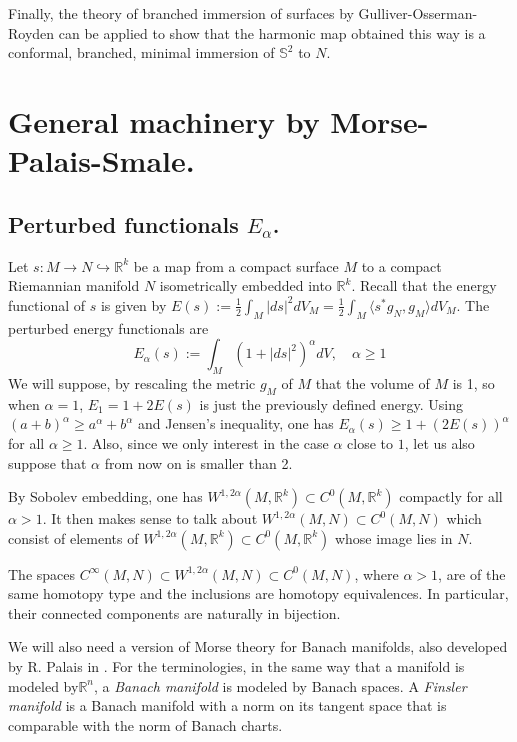 Finally, the theory of branched immersion of surfaces by Gulliver-Osserman-Royden
\cite{gulliver_theory_1973} can be applied to show that the harmonic map obtained this way
is a conformal, branched, minimal immersion of \(\mathbb{S}^2\) to \(N\).

\section{General machinery by Morse-Palais-Smale.}
\label{sec:orga338044}

\subsection{Perturbed functionals \(E_\alpha\).}
\label{sec:orgd6dc53c}

Let \(s: M \longrightarrow N \hookrightarrow \mathbb{R}^k\) be a map from a compact
surface \(M\) to a compact Riemannian manifold \(N\) isometrically embedded into \(\mathbb{R}^k\). Recall that the energy functional of \(s\) is given by \(E(s):=
\frac{1}{2}\int_M |ds|^2 dV_M = \frac{1}{2}\int_M \langle s^* g_N, g_M \rangle dV_M\). The perturbed energy functionals are
\[
 E_\alpha(s) := \int_M\left(1 + |ds|^2\right)^\alpha dV,\quad \alpha \geq 1
\]
We will suppose, by rescaling the metric \(g_M\) of \(M\) that the volume of \(M\)
is 1, so when \(\alpha=1\), \(E_1 =  1+ 2E(s)\) is just the previously defined energy. Using \((a+b)^\alpha \geq a^\alpha + b^\alpha\) and Jensen's inequality, one has \(E_\alpha(s) \geq 1 + (2E(s))^\alpha\) for all \(\alpha \geq 1\). Also, since we only
interest in the case \(\alpha\) close to \(1\), let us also suppose that \(\alpha\) from now on is smaller than 2.

By Sobolev embedding, one has \(W^{1,2\alpha}(M, \mathbb{R}^k) \subset C^0(M,
\mathbb{R}^k)\) compactly for all \(\alpha >1\). It then makes sense to talk about \(W^{1,2\alpha}(M,N) \subset C^0(M,N)\) which consist of elements of \(W^{1,2\alpha}(M,
\mathbb{R}^k)\subset C^0(M, \mathbb{R}^k)\) whose image lies in \(N\).

\begin{theorem}[Palais]
\label{thm:Palais-1}
The spaces \(C^\infty (M,N)\subset W^{1,2\alpha}(M,N)\subset C^0(M,N)\), where \(\alpha>1\), are
of the same homotopy type and the inclusions are homotopy equivalences. In particular,
their connected components are naturally in bijection.
\end{theorem}

We will also need a version of Morse theory for Banach manifolds, also
developed by R. Palais in \cite{palais_lusternik-schnirelman_1966}. For the terminologies, in the same way that a manifold is modeled
by\(\mathbb{R}^n\), a \emph{Banach manifold} is modeled by Banach spaces. A \emph{Finsler
manifold} is a Banach manifold with a norm on its tangent space that is comparable with
the norm of Banach charts.

